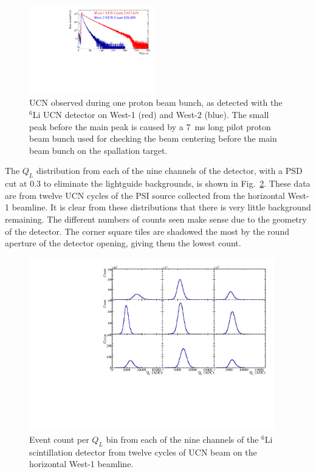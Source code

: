 \documentclass[letter,twocolumn,preprint,3p,numbers,sort&compress]{elsarticle}
\begin{document}
\begin{figure}[htpb] 
\begin{center} 
\includegraphics[width=0.49\textwidth]{figures/run54_to_run40_bunch0_compare.pdf} 
\caption{ UCN observed during one proton beam bunch, as detected with
  the $^6$Li UCN detector on West-1 (red) and West-2 (blue).  The
  small peak before the main peak is caused by a 7~ms long pilot
  proton beam bunch used for checking the beam centering before the
  main beam bunch on the spallation target. }
\label{fig:protonCycle} 
\end{center} 
\end{figure}

The $Q_L$ distribution from each of the nine channels of the detector,
with a PSD cut at 0.3 to eliminate the lightguide backgrounds, is
shown in Fig.~\ref{fig:nineup}.  These data are from twelve UCN cycles
of the PSI source collected from the horizontal West-1 beamline.  It
is clear from these distributions that there is very little background
remaining.  The different numbers of counts seen make sense due to the
geometry of the detector.  The corner square tiles are shadowed the
most by the round aperture of the detector opening, giving them the
lowest count.

\begin{figure}[!htpb]
\centering
\includegraphics[width=0.95\textwidth]{figures/nineup.pdf}
\caption{ Event count per $Q_L$ bin from each of the nine channels of
  the $^{6}$Li scintillation detector from twelve cycles of UCN beam
  on the horizontal West-1 beamline.}
\label{fig:nineup}
\end{figure}
\end{document}
